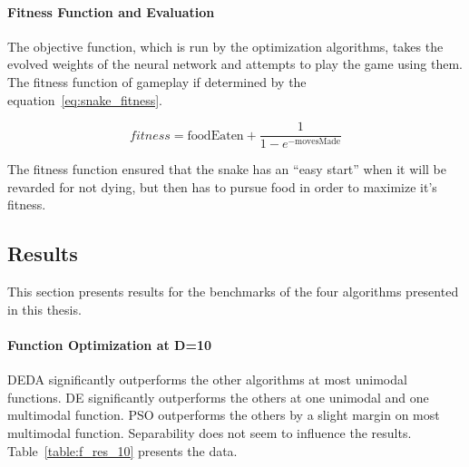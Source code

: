 \paragraph{Fitness Function and Evaluation}

The objective function, which is run by the optimization algorithms, takes the evolved weights of the neural network and attempts to play the game using them. The fitness function of gameplay if determined by the equation~\ref{eq:snake_fitness}.

\begin{equation} \label{eq:snake_fitness}
  fitness = \text{foodEaten} + \frac{1}{1-e^{-\text{movesMade}}}
\end{equation}

The fitness function ensured that the snake has an ``easy start'' when it will be revarded for not dying, but then has to pursue food in order to maximize it's fitness.

\subsection{Results}

This section presents results for the benchmarks of the four algorithms presented in this thesis.

\paragraph{Function Optimization at D=10}
DEDA significantly outperforms the other algorithms at most unimodal functions. DE significantly outperforms the others at one unimodal and one multimodal function. PSO outperforms the others by a slight margin on most multimodal function. Separability does not seem to influence the results. Table~\ref{table:f_res_10} presents the data.

